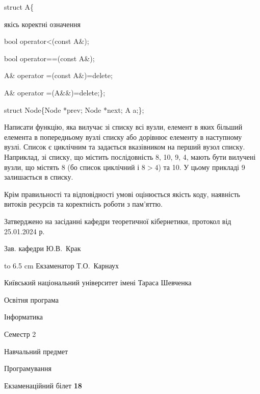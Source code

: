 \documentclass[12pt, ukrainian]{article}
\begin{document}
{struct A\{

\quad  якісь коректні означення 

\quad  bool operator<(const A\&); 

\quad  bool operator==(const A\&); 

\quad A\& operator =(const A\&)=delete; 

\quad  A\& operator =(A\&\&)=delete;\};

struct Node\{Node *prev; Node *next; A a;\};

Написати функцію, яка вилучає зі списку всі вузли, елемент в яких більший елемента в попередньому вузлі списку або дорівнює елементу в наступному вузлі. Список є циклічним та задається вказівником на перший вузол списку. Наприклад, зі списку, що містить послідовність 8, 10, 9, 4, мають бути вилучені вузли, що містять 8 (бо список циклічний і $8>4$) та 10. У цьому прикладі 9 залишається в списку.

Крім правильності та відповідності умові оцінюється якість коду, наявність витоків ресурсів та коректність роботи з пам'яттю. 

}
{\smallskip\smallskip \begin {scriptsize} Затверджено на засіданні кафедри теоретичної кібернетики, протокол   від   25.01.2024 р.\par\smallskip\smallskip\smallskip\smallskip
{\parbox {6.5 cm} {Зав. кафедри \dotfill Ю.В.~Крак}}\hspace {0.7cm} {\hbox to 6.5 cm { Екзаменатор \dotfill Т.О.~Карнаух}} \end{scriptsize}}
\newpage
{{\begin {scriptsize}\par
{ \center  Київський національний університет імені Тараса Шевченка \par}
{\parbox {5 cm}{Освітня програма \hfill}{\parbox {7 cm}{Інформатика\hfill}}\parbox {6 cm}{\hfill Семестр 2}}\par
{\parbox {5 cm} {Навчальний предмет \hfill}\parbox {7 cm}{Програмування \hfill}\parbox {6cm}{\hfill}\par}\vspace{-15pt} \end{scriptsize}}{\center Екзаменаційний білет \No \textbf { 18 }\par}}
\end{document}
